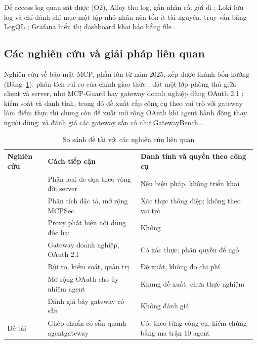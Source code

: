 Để access log quan sát được (O2), Alloy thu log, gắn nhãn rồi gửi đi \parencite{alloy_docs}; Loki lưu log và chỉ đánh chỉ mục một tập nhỏ nhãn nên tốn ít tài nguyên, truy vấn bằng LogQL \parencite{loki_docs}; Grafana hiển thị dashboard khai báo bằng file \parencite{grafana_docs}.

\subsection{Các nghiên cứu và giải pháp liên quan}

Nghiên cứu về bảo mật MCP, phần lớn từ năm 2025, xếp được thành bốn hướng (Bảng~\ref{tab:ch3-related}): phân tích rủi ro của chính giao thức \parencite{hou2025mcp,breakingmcp}; đặt một lớp phòng thủ giữa client và server, như MCP-Guard \parencite{mcpguard} hay gateway doanh nghiệp dùng OAuth 2.1 \parencite{securemcpgw}; kiểm soát và danh tính, trong đó \textcite{securingmcp} đề xuất cấp công cụ theo vai trò với gateway làm điểm thực thi chung còn \textcite{south2025delegation} đề xuất mở rộng OAuth khi agent hành động thay người dùng; và đánh giá các gateway sẵn có như GatewayBench \parencite{gatewaybench}.

\begin{table}[H]\centering\caption{So sánh đề tài với các nghiên cứu liên quan}\label{tab:ch3-related}
{\singlespacing\renewcommand{\arraystretch}{1.2}\small
\begin{tabularx}{\textwidth}{|>{\raggedright\arraybackslash}p{3.3cm}|>{\raggedright\arraybackslash}X|>{\raggedright\arraybackslash}p{4.6cm}|}\hline
\textbf{Nghiên cứu} & \textbf{Cách tiếp cận} & \textbf{Danh tính và quyền theo công cụ} \\ \hline
\textcite{hou2025mcp} & Phân loại đe dọa theo vòng đời server & Nêu biện pháp, không triển khai \\ \hline
\textcite{breakingmcp} & Phân tích đặc tả, mở rộng MCPSec & Xác thực thông điệp; không theo vai trò \\ \hline
\textcite{mcpguard} & Proxy phát hiện nội dung độc hại & Không \\ \hline
\textcite{securemcpgw} & Gateway doanh nghiệp, OAuth 2.1 & Có xác thực; phân quyền để ngỏ \\ \hline
\textcite{securingmcp} & Rủi ro, kiểm soát, quản trị & Đề xuất, không đo chi phí \\ \hline
\textcite{south2025delegation} & Mở rộng OAuth cho ủy nhiệm agent & Khung đề xuất, chưa thực nghiệm \\ \hline
\textcite{gatewaybench} & Đánh giá bảy gateway có sẵn & Không đánh giá \\ \hline
Đề tài & Ghép chuẩn có sẵn quanh agentgateway & Có, theo từng công cụ, kiểm chứng bằng ma trận 10 agent \\ \hline
\end{tabularx}}\end{table}

